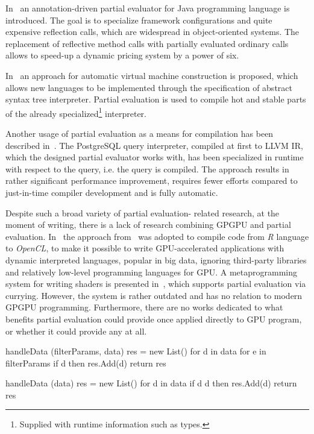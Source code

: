 In~\cite{JavaPe} an annotation-driven partial evaluator for Java programming language is introduced.
The goal is to specialize framework configurations and quite expensive reflection calls, which are widespread in object-oriented systems. The replacement of reflective method calls with partially evaluated ordinary calls allows to speed-up a dynamic pricing system by a power of six.

In~\cite{SuperVm} an approach for automatic virtual machine construction is proposed, which allows new languages to be implemented through the specification of abstract syntax tree interpreter. Partial evaluation is used to compile hot and stable parts of the already specialized\footnote{Supplied with runtime information such as types.} interpreter.

Another usage of partial evaluation as a means for compilation has been described in~\cite{LLVM-mix}. The PostgreSQL query interpreter, compiled at first to LLVM IR, which the designed partial evaluator works with, has been specialized in runtime with respect to the query, i.e. the query is compiled. The approach results in rather significant performance improvement, requires fewer efforts compared to just-in-time compiler development and is fully automatic.


Despite such a broad variety of partial evaluation- related research, at the moment of writing, there is a lack of research combining GPGPU and partial evaluation.
In~\cite{JitGPUPE} the approach from~\cite{SuperVm} was adopted to compile code from \emph{R} language to \emph{OpenCL}, to make it possible to write GPU-accelerated applications with dynamic interpreted languages, popular in big data, ignoring third-party libraries and relatively low-level programming languages for GPU. A metaprogramming system for writing shaders is presented in~\cite{GPUsh}, which supports partial evaluation via currying. However, the system is rather outdated and has no relation to modern GPGPU programming. Furthermore, there are no works dedicated to what benefits partial evaluation could provide once applied directly to GPU program, or whether it could provide any at all.

\begin{code}[language=Java,label=fig:kernel,caption=A typical GPGPU kernel]
handleData (filterParams, data)
{
  res = new List()
  for d in data
     for e in filterParams
        if d %
        then res.Add(d)
  return res
}
\end{code}


\begin{code}[language = Java, label = fig:kernel_mix,caption={ A typical GPGPU kernel specialization with respect to {[2;3]}}]
handleData (data)
{
  res = new List()
  for d in data
    if d %
       d %
    then res.Add(d)
  return res
}
\end{code}

